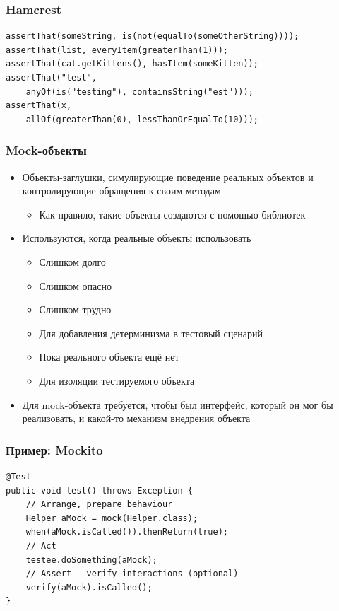 \documentclass[xetex,mathserif,serif]{beamer}
\begin{document}
	\begin{frame}[fragile]
		\frametitle{Hamcrest}
		\begin{verbatim}
assertThat(someString, is(not(equalTo(someOtherString))));
assertThat(list, everyItem(greaterThan(1)));
assertThat(cat.getKittens(), hasItem(someKitten));
assertThat("test", 
    anyOf(is("testing"), containsString("est")));
assertThat(x, 
    allOf(greaterThan(0), lessThanOrEqualTo(10)));
		\end{verbatim}
\end{frame}

	\begin{frame}
		\frametitle{Mock-объекты}
		\begin{itemize}
			\item Объекты-заглушки, симулирующие поведение реальных объектов и контролирующие обращения к своим методам
			\begin{itemize}
				\item Как правило, такие объекты создаются с помощью библиотек
			\end{itemize}
			\item Используются, когда реальные объекты использовать
			\begin{itemize}
				\item Слишком долго
				\item Слишком опасно
				\item Слишком трудно
				\item Для добавления детерминизма в тестовый сценарий
				\item Пока реального объекта ещё нет
				\item Для изоляции тестируемого объекта
			\end{itemize}
			\item Для mock-объекта требуется, чтобы был интерфейс, который он мог бы реализовать, и какой-то механизм внедрения объекта
		\end{itemize}
	\end{frame}

	\begin{frame}[fragile]
		\frametitle{Пример: Mockito}
		\begin{verbatim}
@Test
public void test() throws Exception {
    // Arrange, prepare behaviour
    Helper aMock = mock(Helper.class);
    when(aMock.isCalled()).thenReturn(true);
    // Act
    testee.doSomething(aMock);
    // Assert - verify interactions (optional)
    verify(aMock).isCalled();
}
		\end{verbatim}
\end{frame}
\end{document}
